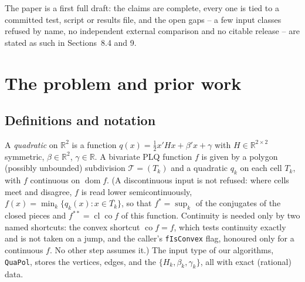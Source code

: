 \documentclass[11pt]{article}
\theoremstyle{definition}
\newcommand{\R}{\mathbb{R}}
\DeclareMathOperator{\dom}{dom}
\DeclareMathOperator{\cl}{cl}
\DeclareMathOperator{\co}{co}
\begin{document}
The paper is a first full draft: the claims are complete, every one is tied to
a committed test, script or results file, and the open gaps -- a few
input classes refused by name, no independent external comparison
and no citable release
-- are stated as such in Sections~8.4 and 9.

\section{The problem and prior work}

\subsection{Definitions and notation}

A \emph{quadratic} on $\R^2$ is a function
$q(x) = \tfrac12 x'Hx + \beta'x + \gamma$ with $H\in\R^{2\times2}$ symmetric,
$\beta\in\R^2$, $\gamma\in\R$. A bivariate PLQ function $f$ is given by a
polygon (possibly unbounded) subdivision $\mathcal T = (T_k)$ and a quadratic
$q_k$ on each cell $T_k$, with $f$ continuous on $\dom f$. (A discontinuous
input is not refused: where cells meet and disagree, $f$ is read lower
semicontinuously, $f(x)=\min_k\{q_k(x): x\in\overline{T_k}\}$, so that
$f^*=\sup_k$ of the conjugates of the closed pieces and
$f^{**}=\cl\co f$ of this function. Continuity is needed only by two named
shortcuts: the convex shortcut $\co f=f$, which tests continuity exactly and
is not taken on a jump, and the caller's \texttt{fIsConvex} flag, honoured only
for a continuous $f$. No other step assumes it.) The input type of
our algorithms, \texttt{QuaPol}, stores the vertices, edges, and the
$\{H_k,\beta_k,\gamma_k\}$, all with exact (rational) data.
\end{document}

